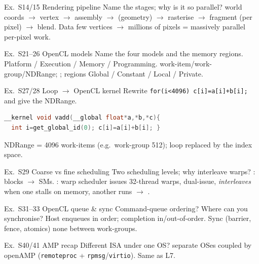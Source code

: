 \begin{example2}{Ex.\ S14/15 Rendering pipeline}
    Name the stages; why is it so parallel?
    \tcblower
    world coords $\to$ vertex $\to$ assembly $\to$ (geometry) $\to$ rasterise $\to$ fragment (per pixel) $\to$ blend. Data  few vertices $\to$ millions of pixels = massively parallel per-pixel work.
\end{example2}

\begin{example2}{Ex.\ S21--26 OpenCL models}
    Name the four models and the memory regions.
    \tcblower
    Platform / Execution / Memory / Programming. work-item/work-group/NDRange; ; regions Global / Constant / Local / Private.
\end{example2}

\begin{example2}{Ex.\ S27/28 Loop $\to$ OpenCL kernel}
    Rewrite \texttt{for(i<4096) c[i]=a[i]+b[i];} and give the NDRange.
    \tcblower
\begin{lstlisting}[language=C, style=basesmol]
__kernel void vadd(__global float*a,*b,*c){
  int i=get_global_id(0); c[i]=a[i]+b[i]; }
\end{lstlisting}
    NDRange = 4096 work-items (e.g.\ work-group 512); loop replaced by the index space.
\end{example2}

\begin{example2}{Ex.\ S29 Coarse vs fine scheduling}
    Two scheduling levels; why interleave warps?
    \tcblower
    : blocks $\to$ SMs. : warp scheduler issues 32-thread warps, dual-issue, \emph{interleaves} when one stalls on memory, another runs $\to$ .
\end{example2}

\begin{example2}{Ex.\ S31--33 OpenCL queue \& sync}
    Command-queue ordering? Where can you synchronise?
    \tcblower
    Host enqueues in order; completion in/out-of-order. Sync  (barrier, fence, atomics) none between work-groups.
\end{example2}

\begin{example2}{Ex.\ S40/41 AMP recap}
    Different ISA under one OS?
    \tcblower
     separate OSes coupled by openAMP (\texttt{remoteproc} + \texttt{rpmsg}/\texttt{virtio}). Same as L7.
\end{example2}
